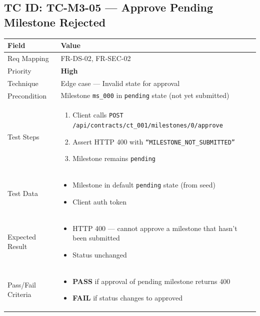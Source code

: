 \documentclass[12pt,a4paper]{article}
\newcommand{\sevhigh}{\textcolor{severityhigh}{\textbf{High}}}
\newcommand{\passresult}{\textcolor{passgreen}{\textbf{PASS}}}
\newcommand{\failresult}{\textcolor{failred}{\textbf{FAIL}}}
\begin{document}
\vspace{0.8cm}

\subsection{TC ID: TC-M3-05 --- Approve Pending Milestone Rejected}

\begin{tabular}{|p{}|p{}|}
\hline
\rowcolor{lightblue} \textbf{Field} & \textbf{Value} \\
\hline
Req Mapping & FR-DS-02, FR-SEC-02 \\
\hline
Priority & \sevhigh \\
\hline
Technique & Edge case --- Invalid state for approval \\
\hline
Precondition & Milestone \texttt{ms\_000} in \texttt{pending} state (not yet submitted) \\
\hline
Test Steps &
\begin{enumerate}[nosep, leftmargin=*]
  \item Client calls \texttt{POST /api/contracts/ct\_001/milestones/0/approve}
  \item Assert HTTP 400 with \texttt{``MILESTONE\_NOT\_SUBMITTED''}
  \item Milestone remains \texttt{pending}
\end{enumerate} \\
\hline
Test Data &
\begin{itemize}[nosep, leftmargin=*]
  \item Milestone in default \texttt{pending} state (from seed)
  \item Client auth token
\end{itemize} \\
\hline
Expected Result &
\begin{itemize}[nosep, leftmargin=*]
  \item HTTP 400 --- cannot approve a milestone that hasn't been submitted
  \item Status unchanged
\end{itemize} \\
\hline
Pass/Fail Criteria &
\begin{itemize}[nosep, leftmargin=*]
  \item \passresult{} if approval of pending milestone returns 400
  \item \failresult{} if status changes to approved
\end{itemize} \\
\hline
\end{tabular}
\end{document}
